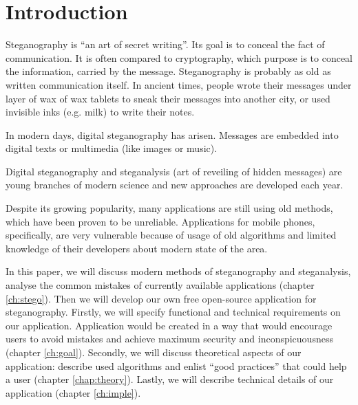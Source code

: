 \chapter*{Introduction}


Steganography is ``an art of secret writing''. Its goal is 
to conceal the fact of communication. It is often compared
to cryptography, which purpose is to conceal the information,
carried by the message. Steganography is probably as old as written
communication itself. In ancient times, people wrote their messages
under layer of wax of wax tablets to sneak their messages into another
city, or used invisible inks (e.g. milk) to write their notes.

In modern days, digital steganography has arisen. Messages are embedded
into digital texts or multimedia (like images or music).

Digital steganography and steganalysis (art of reveiling of hidden messages) 
are young branches of modern science and new approaches are developed each year.

Despite its growing popularity, many applications are still using old methods,
which have been proven to be unreliable. Applications for mobile phones, specifically,
are very vulnerable because of usage of old algorithms and limited knowledge of their
developers about modern state of the area.

In this paper, we will discuss modern methods of steganography and steganalysis, analyse
the common mistakes of currently available applications (chapter \ref{ch:stego}). Then we
will develop our own free open-source application for steganography. Firstly, we will specify
functional and technical requirements on our application. Application would be created in a way
that would encourage users to avoid mistakes and achieve maximum security and inconspicuousness
(chapter \ref{ch:goal}). Secondly, we will discuss theoretical aspects of our application: describe
used algorithms and enlist ``good practices'' that could help a user (chapter \ref{chap:theory}).
Lastly, we will describe technical details of our application (chapter \ref{ch:imple}).
